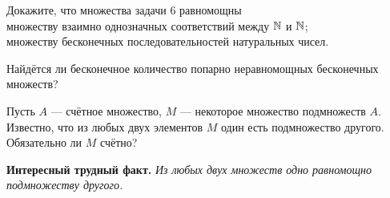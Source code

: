 \documentclass[a4paper,12pt]{article}
\begin{document}
Докажите, что множества задачи 6 равномощны \\
множеству взаимно однозначных соответствий между $\mathbb{N}$ и $\mathbb{N}$; \\
множеству бесконечных последовательностей %
натуральных чисел.


 Найдётся ли бесконечное количество попарно неравномощных бесконечных множеств?

 Пусть $A$ --- счётное множество,
$M$ --- некоторое множество подмножеств $A$. Известно, что из
любых двух элементов $M$ один есть подмножество другого.
Обязательно ли $M$ счётно?

\smallskip
\noindent
{\bf Интересный трудный факт.}
{\em Из любых двух множеств одно равномощно подмножеству другого.}

\smallskip



\end{document}
